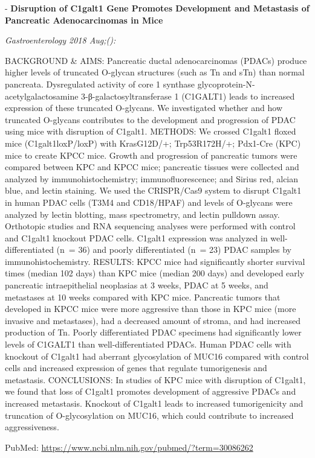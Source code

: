 \documentclass[]{article}
\begin{document}
 - \textbf{Disruption of C1galt1 Gene Promotes Development and
Metastasis of Pancreatic Adenocarcinomas in Mice}

\emph{Gastroenterology 2018 Aug;():}

BACKGROUND \& AIMS: Pancreatic ductal adenocarcinomas (PDACs) produce
higher levels of truncated O-glycan structures (such as Tn and sTn) than
normal pancreata. Dysregulated activity of core 1 synthase
glycoprotein-N-acetylgalactosamine 3-β-galactosyltransferase 1 (C1GALT1)
leads to increased expression of these truncated O-glycans. We
investigated whether and how truncated O-glycans contributes to the
development and progression of PDAC using mice with disruption of
C1galt1. METHODS: We crossed C1galt1 floxed mice (C1galt1loxP/loxP) with
KrasG12D/+; Trp53R172H/+; Pdx1-Cre (KPC) mice to create KPCC mice.
Growth and progression of pancreatic tumors were compared between KPC
and KPCC mice; pancreatic tissues were collected and analyzed by
immunohistochemistry; immunofluorescence; and Sirius red, alcian blue,
and lectin staining. We used the CRISPR/Cas9 system to disrupt C1galt1
in human PDAC cells (T3M4 and CD18/HPAF) and levels of O-glycans were
analyzed by lectin blotting, mass spectrometry, and lectin pulldown
assay. Orthotopic studies and RNA sequencing analyses were performed
with control and C1galt1 knockout PDAC cells. C1galt1 expression was
analyzed in well-differentiated (n~= 36) and poorly differentiated (n~=
23) PDAC samples by immunohistochemistry. RESULTS: KPCC mice had
significantly shorter survival times (median 102 days) than KPC mice
(median 200 days) and developed early pancreatic intraepithelial
neoplasias at 3 weeks, PDAC at 5 weeks, and metastases at 10 weeks
compared with KPC mice. Pancreatic tumors that developed in KPCC mice
were more aggressive than those in KPC mice (more invasive and
metastases), had a decreased amount of stroma, and had increased
production of Tn. Poorly differentiated PDAC specimens had significantly
lower levels of C1GALT1 than well-differentiated PDACs. Human PDAC cells
with knockout of C1galt1 had aberrant glycosylation of MUC16 compared
with control cells and increased expression of genes that regulate
tumorigenesis and metastasis. CONCLUSIONS: In studies of KPC mice with
disruption of C1galt1, we found that loss of C1galt1 promotes
development of aggressive PDACs and increased metastasis. Knockout of
C1galt1 leads to increased tumorigenicity and truncation of
O-glycosylation on MUC16, which could contribute to increased
aggressiveness.

PubMed: \url{https://www.ncbi.nlm.nih.gov/pubmed/?term=30086262}
\end{document}
